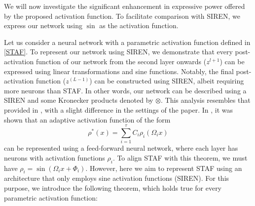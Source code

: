We will now investigate the significant enhancement in expressive power offered by the proposed activation function. To facilitate comparison with SIREN, we express our network using $\sin$ as the activation function.

Let us consider a neural network with a parametric activation function defined in \eqref{STAF}. To represent our network using SIREN, we demonstrate that every post-activation function of our network from the second layer onwards ($z^{l+1}$) can be expressed using linear transformations and sine functions. Notably, the final post-activation function ($z^{(L-1)}$) can be constructed using SIREN, albeit requiring more neurons than STAF. In other words, our network can be described using a SIREN and some Kronecker products denoted by $\otimes$. This analysis resembles that provided in \citep{jagtap2022deep}, with a slight difference in the settings of the paper. In \citep{jagtap2022deep}, it was shown that an adaptive activation function of the form
\begin{equation}
\rho^*(x) = \sum_{i=1}^{\tau}C_i \rho_{i}(\Omega_ix)
\end{equation}
can be represented using a feed-forward neural network, where each layer has neurons with activation functions $\rho_{i}$. To align STAF with this theorem, we must have $\rho_i=\sin(\Omega_ix+\Phi_i)$. However, here we aim to represent STAF using an architecture that only employs sine activation functions (SIREN). For this purpose, we introduce the following theorem, which holds true for every parametric activation function:

